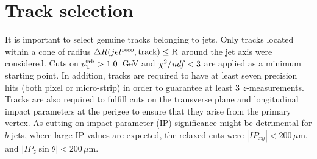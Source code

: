 \section{Track selection }\label{sec:TrackSelection}

It is important to select genuine tracks belonging to jets. Only tracks located  within a cone of radius $\Delta R(jet^{\rm reco},\rm track) \leq R$ around the jet axis were considered. Cuts on $p_{\rm{T}}^{\rm{trk}}>1.0$~GeV and $\chi^2/{\it ndf}<3$ are applied as a minimum starting point. In addition, tracks are required to have at least seven precision hits (both pixel or micro-strip) in order to guarantee at least 3 $z$-measurements. Tracks are also required to fulfill cuts on the transverse plane and longitudinal impact parameters at the perigee to ensure that they arise from  the primary vertex. As cutting on impact parameter (IP) significance might be detrimental for $b$-jets, where large IP values are expected, the relaxed cuts were $|IP_{xy}|<200\,\mu$m, and $|IP_{z}\sin\theta|<200\,\mu$m. %


